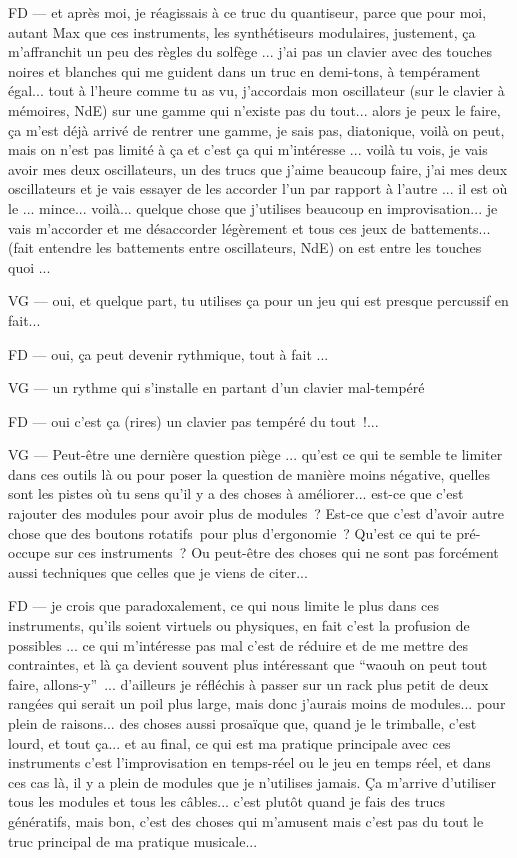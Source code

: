 FD — et après moi, je réagissais à ce truc du quantiseur, parce que pour moi, autant Max que ces instruments, les synthétiseurs modulaires, justement, ça m'affranchit un peu des règles du solfège ... j'ai pas un clavier avec des touches noires et blanches qui me guident dans un truc en demi-tons, à tempérament égal... tout à l'heure comme tu as vu, j'accordais mon oscillateur (sur le clavier à mémoires, NdE) sur une gamme qui n'existe pas du tout... alors je peux le faire, ça m'est déjà arrivé de rentrer une gamme, je sais pas, diatonique, voilà on peut, mais on n'est pas limité à ça et c'est ça qui m'intéresse ... voilà tu vois, je vais avoir mes deux oscillateurs, un des trucs que j'aime beaucoup faire, j'ai mes deux oscillateurs et je vais essayer de les accorder l'un par rapport à l'autre ... il est où le ... mince... voilà... quelque chose que j'utilises beaucoup en improvisation... je vais m'accorder et me désaccorder légèrement et tous ces jeux de battements... (fait entendre les battements entre oscillateurs, NdE) on est entre les touches quoi ... 

VG — oui, et quelque part, tu utilises ça pour un jeu qui est presque percussif en fait... 

FD — oui, ça peut devenir rythmique, tout à fait ... 

VG — un rythme qui s'installe en partant d'un clavier mal-tempéré 

FD — oui c'est ça (rires) un clavier pas tempéré du tout !... 

VG — Peut-être une dernière question piège ... qu'est ce qui te semble te limiter dans ces outils là ou pour poser la question de manière moins négative, quelles sont les pistes où tu sens qu'il y a des choses à améliorer... est-ce que c'est rajouter des modules pour avoir plus de modules ? Est-ce que c'est d'avoir autre chose que des boutons rotatifs pour plus d'ergonomie ? Qu'est ce qui te pré-occupe sur ces instruments ? Ou peut-être des choses qui ne sont pas forcément aussi techniques que celles que je viens de citer... 

FD — je crois que paradoxalement, ce qui nous limite le plus dans ces instruments, qu'ils soient virtuels ou physiques, en fait c'est la profusion de possibles ... ce qui m'intéresse pas mal c'est de réduire et de me mettre des contraintes, et là ça devient souvent plus intéressant que ``waouh on peut tout faire, allons-y'' ... d'ailleurs je réfléchis à passer sur un rack plus petit de deux rangées qui serait un poil plus large, mais donc j'aurais moins de modules... pour plein de raisons... des choses aussi prosaïque que, quand je le trimballe, c'est lourd, et tout ça... et au final, ce qui est ma pratique principale avec ces instruments c'est l'improvisation en temps-réel ou le jeu en temps réel, et dans ces cas là, il y a plein de modules que je n'utilises jamais. Ça m'arrive d'utiliser tous les modules et tous les câbles... c'est plutôt quand je fais des trucs génératifs, mais bon, c'est des choses qui m'amusent mais c'est pas du tout le truc principal de ma pratique musicale... 

